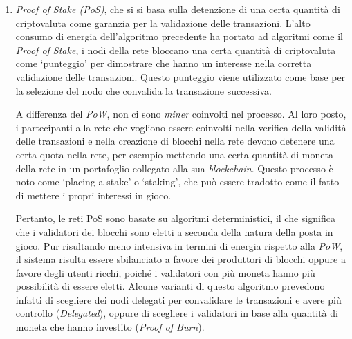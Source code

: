 \begin{enumerate}
    \item\textit{{Proof of Stake (PoS)}}, che si si basa sulla detenzione di una certa quantità di criptovaluta come garanzia per la validazione delle transazioni. 
    L'alto consumo di energia dell'algoritmo precedente ha portato ad algoritmi come il \textit{Proof of Stake}, i nodi della rete bloccano una certa quantità di criptovaluta come `punteggio'
    per dimostrare che hanno un interesse nella corretta validazione delle transazioni. 
    Questo punteggio viene utilizzato come base per la selezione del nodo che convalida la transazione successiva. 
    
    A differenza del \textit{PoW}, non ci sono \textit{miner} coinvolti nel processo. Al loro posto, i partecipanti alla rete che 
    vogliono essere coinvolti nella verifica della validità delle transazioni e nella creazione di blocchi nella rete 
    devono detenere una certa quota nella rete, per esempio mettendo una certa quantità di moneta della rete in un portafoglio collegato 
    alla sua \textit{blockchain}. Questo processo è noto come `placing a stake' o `staking', che può essere tradotto come il fatto di mettere i propri interessi in gioco. 
    
    Pertanto, le reti PoS sono basate su algoritmi deterministici, il che significa che i validatori dei blocchi sono eletti a seconda della natura della posta in gioco. 
    Pur risultando meno intensiva in termini di energia rispetto alla \textit{PoW}, il sistema risulta essere sbilanciato a favore dei produttori di blocchi oppure a favore degli utenti ricchi, 
    poiché i validatori con più moneta hanno più possibilità di essere eletti. 
    Alcune varianti di questo algoritmo prevedono infatti di scegliere dei nodi delegati per convalidare le transazioni e avere più controllo (\textit{Delegated}), 
    oppure di scegliere i validatori in base alla quantità di moneta che hanno investito (\textit{Proof of Burn}).

\end{enumerate}

\clearpage

